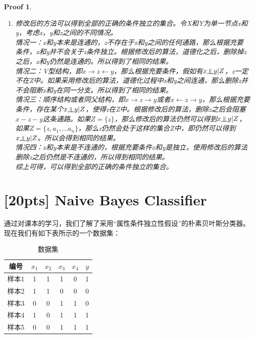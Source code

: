 \documentclass[a4paper,UTF8]{article}
\numberwithin{equation}{section}
\newtheorem*{myProof}{Proof}
\newcommand{\indep}{\rotatebox[origin=c]{90}{$\models$}}
\begin{document}
\begin{myProof}
\begin{enumerate}[(1)]
\begin{equation}
\begin{aligned}
&A \indep C | B,E,D\\
&A \indep D | B,E\\
&B \indep D | A,E\\
&B \indep E | A,D
\end{aligned}
\end{equation}
\item 
修改后的方法可以得到全部的正确的条件独立的集合。令X和Y为单一节点x和y，考虑x，y和z之间的不同情况。\\
情况一：x和y本来是连通的，z不存在于x和y之间的任何通路，那么根据充要条件，x和y并不会关于z条件独立。根据修改后的算法，道德化之后，删除掉z之后，x和y仍然是连通的。所以得到了相同的结果。\\
情况二：V型结构，即$x\rightarrow z \leftarrow y$，那么根据充要条件，假如有$x \indep y | Z$，z一定不在Z中。如果采用修改后的算法，道德化过程中x和y之间连通，那么删除z并不会阻断x和y在同一分支。所以得到了相同的结果。\\
情况三：顺序结构或者同父结构，即$x\rightarrow z\rightarrow y$或者$x\leftarrow z\rightarrow y$，那么根据充要条件，存在某个$x \indep y | Z$，使得z在Z中。根据修改后的算法，删除z之后会阻塞$x-z-y$这条通路。如果$Z = \{z\}$，那么修改后的算法仍然可以得到$x \indep y | Z$，如果$Z = \{z, a_1,...a_n\}$，那么z仍然会处于这样的集合Z中，即仍然可以得到$x \indep y | Z$。所以会得到相同的结果。\\
情况四：x和y本来是不连通的，根据充要条件x和y是独立，使用修改后的算法删除z之后仍然是不连通的，所以得到相同的结果。\\
综上可得，可以得到全部的正确的条件独立的集合。
\end{enumerate}
\end{myProof}
\newpage
\section{[20pts] Naive Bayes Classifier}
	
	通过对课本的学习，我们了解了采用“属性条件独立性假设”的朴素贝叶斯分类器。现在我们有如下表所示的一个数据集：
	\begin{table}[htp]
		\centering
		\caption{数据集}\label{tab:aStrangeTable}
	\begin{tabular}{c|ccccc}
		\hline 
	编号	& $x_1$ & $x_2$ & $x_3$ & $x_4$ & $y$ \\ 
		\hline 
	样本1	& 1 & 1 & 1 & 0 & 1 \\ 
		\hline 
	样本2	& 1 & 1 & 0 & 0 & 0 \\ 
		\hline 
	样本3	& 0 & 0 & 1 & 1 & 0 \\ 
		\hline 
	样本4	& 1 & 0 & 1 & 1 & 1 \\ 
		\hline 
	样本5	& 0 & 0 & 1 & 1 & 1 \\ 
		\hline 
	\end{tabular}
	\end{table} 
	
\end{document}

